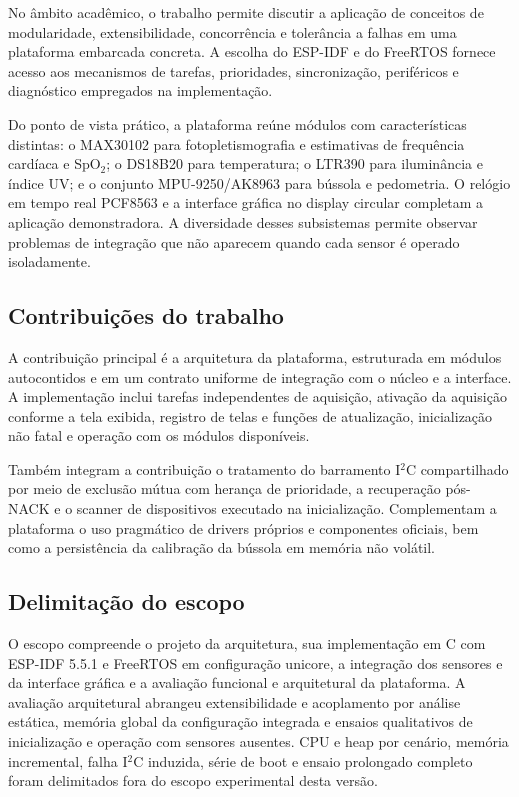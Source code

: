 \documentclass[a4paper,12pt]{article}
\begin{document}
No \^ambito acad\^emico, o trabalho permite discutir a aplica\c{c}\~ao de conceitos de modularidade, extensibilidade, concorr\^encia e toler\^ancia a falhas em uma plataforma embarcada concreta. A escolha do ESP-IDF e do FreeRTOS fornece acesso aos mecanismos de tarefas, prioridades, sincroniza\c{c}\~ao, perif\'ericos e diagn\'ostico empregados na implementa\c{c}\~ao.

Do ponto de vista pr\'atico, a plataforma re\'une m\'odulos com caracter\'isticas distintas: o MAX30102 para fotopletismografia e estimativas de frequ\^encia card\'iaca e SpO$_2$; o DS18B20 para temperatura; o LTR390 para ilumin\^ancia e \'indice UV; e o conjunto MPU-9250/AK8963 para b\'ussola e pedometria. O rel\'ogio em tempo real PCF8563 e a interface gr\'afica no display circular completam a aplica\c{c}\~ao demonstradora. A diversidade desses subsistemas permite observar problemas de integra\c{c}\~ao que n\~ao aparecem quando cada sensor \'e operado isoladamente.

\subsection{Contribui\c{c}\~oes do trabalho}

A contribui\c{c}\~ao principal \'e a arquitetura da plataforma, estruturada em m\'odulos autocontidos e em um contrato uniforme de integra\c{c}\~ao com o n\'ucleo e a interface. A implementa\c{c}\~ao inclui tarefas independentes de aquisi\c{c}\~ao, ativa\c{c}\~ao da aquisi\c{c}\~ao conforme a tela exibida, registro de telas e fun\c{c}\~oes de atualiza\c{c}\~ao, inicializa\c{c}\~ao n\~ao fatal e opera\c{c}\~ao com os m\'odulos dispon\'iveis.

Tamb\'em integram a contribui\c{c}\~ao o tratamento do barramento I$^2$C compartilhado por meio de exclus\~ao m\'utua com heran\c{c}a de prioridade, a recupera\c{c}\~ao p\'os-NACK e o scanner de dispositivos executado na inicializa\c{c}\~ao. Complementam a plataforma o uso pragm\'atico de drivers pr\'oprios e componentes oficiais, bem como a persist\^encia da calibra\c{c}\~ao da b\'ussola em mem\'oria n\~ao vol\'atil.

\subsection{Delimita\c{c}\~ao do escopo}

O escopo compreende o projeto da arquitetura, sua implementa\c{c}\~ao em C com ESP-IDF 5.5.1 e FreeRTOS em configura\c{c}\~ao unicore, a integra\c{c}\~ao dos sensores e da interface gr\'afica e a avalia\c{c}\~ao funcional e arquitetural da plataforma. A avalia\c{c}\~ao arquitetural abrangeu extensibilidade e acoplamento por an\'alise est\'atica, mem\'oria global da configura\c{c}\~ao integrada e ensaios qualitativos de inicializa\c{c}\~ao e opera\c{c}\~ao com sensores ausentes. CPU e heap por cen\'ario, mem\'oria incremental, falha I$^2$C induzida, s\'erie de boot e ensaio prolongado completo foram delimitados fora do escopo experimental desta vers\~ao.
\end{document}
